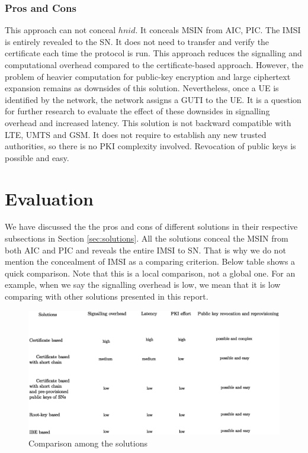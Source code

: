 \documentclass[lnicst,sechang,a4paper]{svmultln}
\begin{document}
\subsubsection{Pros and Cons}
This approach can not conceal $hnid$. It conceals MSIN from AIC, PIC. The IMSI is entirely revealed to the SN. It does not need to transfer and verify the certificate each time the protocol is run. This approach reduces the signalling and computational overhead compared to the certificate-based approach. However, the problem of heavier computation for public-key encryption and large ciphertext expansion remains as downsides of this solution.  Nevertheless, once a UE is identified by the network, the network assigns a GUTI to the UE. It is a question for further research to evaluate the effect of these downsides in signalling overhead and increased latency. This solution is not backward compatible with LTE, UMTS and GSM. It does not require to establish any new trusted authorities, so there is no PKI complexity involved. Revocation of public keys is possible and easy.




\section{Evaluation}
\label{sec:evaluation}
We have discussed the the pros and cons of different solutions in their respective subsections in Section \ref{sec:solutions}. All the solutions conceal the MSIN from both AIC and PIC and reveals the entire IMSI to SN. That is why we do not mention the concealment of IMSI as a comparing criterion.  Below table shows a quick comparison. Note that this is a local comparison, not a global one. For an example, when we say the signalling overhead is low, we mean that it is low comparing with other solutions presented in this report. 

\begin{figure}
\begin{center}
  \includegraphics[width=.98\textwidth]{compare.eps}
\caption{Comparison among the solutions}
\label{fig:solution_ibc}       %
\end{center}
\end{figure}
\end{document}
